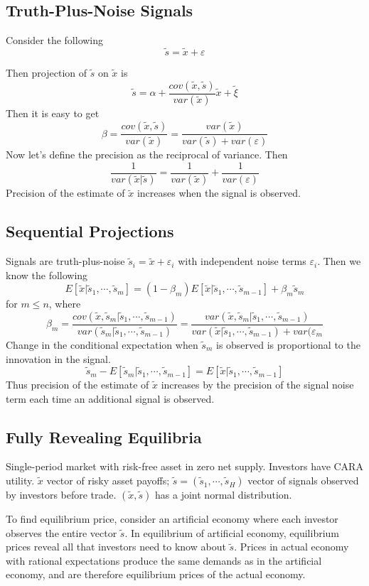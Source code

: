 \documentclass[11pt, a4paper, oneside]{article}
\theoremstyle{definition}
\theoremstyle{proposition}
\theoremstyle{corollary}
\theoremstyle{lemma}
\theoremstyle{theorem}
\begin{document}
\subsection{Truth-Plus-Noise Signals}
Consider the following
$$\tilde{s} = \tilde{x} + \varepsilon$$

Then projection of $\tilde{s}$ on $\tilde{x}$ is
$$\tilde{s} = \alpha + \frac{cov(\tilde{x}, \tilde{s})}{var(\tilde{x})} \tilde{x} + \tilde{\xi}$$
Then it is easy to get
$$\beta =  \frac{cov(\tilde{x}, \tilde{s})}{var(\tilde{x})} = \frac{var(\tilde{x})}{var(\tilde{s}) + var(\varepsilon)}$$
Now let's define the precision as the reciprocal of variance. Then
$$\frac{1}{var(\tilde{x}| \tilde{s})} = \frac{1}{var(\tilde{x})} + \frac{1}{var(\varepsilon)}$$
Precision of the estimate of $\tilde{x}$ increases when the signal is observed. 

\subsection{Sequential Projections}
Signals are truth-plus-noise $\tilde{s}_i = \tilde{x} + \varepsilon_i$ with independent noise terms $\varepsilon_i$. Then we know the following
$$E[\tilde{x}|\tilde{s}_1, \cdots, \tilde{s}_m] = (1- \beta_m)E[\tilde{x}|\tilde{s}_1, \cdots, \tilde{s}_{m-1}] + \beta_m\tilde{s}_m$$ 
for $m \leq n$, where
$$\beta_m = \frac{cov(\tilde{x}, \tilde{s}_m| \tilde{s}_1, \cdots, \tilde{s}_{m-1})}{var(\tilde{s}_m|\tilde{s}_1, \cdots, \tilde{s}_{m-1})} = \frac{var(\tilde{x}, \tilde{s}_m| \tilde{s}_1, \cdots, \tilde{s}_{m-1})}{var(\tilde{x}|\tilde{s}_1, \cdots, \tilde{s}_{m-1})+var(\varepsilon_m}$$
Change in the conditional expectation when $\tilde{s}_m$ is observed is proportional to the innovation in the signal. 
$$\tilde{s}_m - E[\tilde{s}_m|\tilde{s}_1, \cdots, \tilde{s}_{m-1}] = E[\tilde{x}|\tilde{s}_1, \cdots, \tilde{s}_{m-1}]$$
Thus precision of the estimate of $\tilde{x}$ increases by the precision of the signal noise term each time an additional signal is observed. 
\subsection{Fully Revealing Equilibria}
Single-period market with risk-free asset in zero net supply. Investors have CARA utility. $\tilde{x}$ vector of risky asset payoffs; $\tilde{s} = (\tilde{s}_1, \cdots, \tilde{s}_H)$ vector of signals observed by investors before trade. $(\tilde{x}, \tilde{s})$ 
has a joint normal distribution. 

To find equilibrium price, consider an artificial economy where each investor observes the entire vector $\tilde{s}$. In equilibrium of artificial economy,  equilibrium prices reveal all that investors need to know about $\tilde{s}$. Prices in actual economy with rational expectations produce the same demands as in the artificial economy, and are therefore equilibrium prices of the actual economy. 
\end{document}
